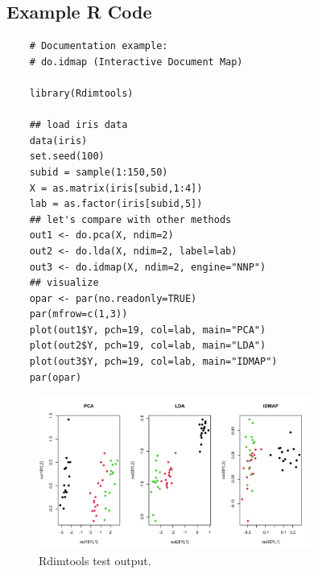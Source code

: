 \documentclass[a4paper,12pt]{article}
\begin{document}
\subsection{Example R Code}

\begin{verbatim}
    # Documentation example:
    # do.idmap (Interactive Document Map)

    library(Rdimtools)

    ## load iris data
    data(iris)
    set.seed(100)
    subid = sample(1:150,50)
    X = as.matrix(iris[subid,1:4])
    lab = as.factor(iris[subid,5])
    ## let's compare with other methods
    out1 <- do.pca(X, ndim=2)
    out2 <- do.lda(X, ndim=2, label=lab)
    out3 <- do.idmap(X, ndim=2, engine="NNP")
    ## visualize
    opar <- par(no.readonly=TRUE)
    par(mfrow=c(1,3))
    plot(out1$Y, pch=19, col=lab, main="PCA")
    plot(out2$Y, pch=19, col=lab, main="LDA")
    plot(out3$Y, pch=19, col=lab, main="IDMAP")
    par(opar)
\end{verbatim}

\begin{figure}[h]
    \centering
    \includegraphics[width=0.8\textwidth]{../../code/Rdimtools_test.png}
    \caption{Rdimtools test output.}
    \label{fig:rdimtools_test}
\end{figure}


\pagebreak
\printbibliography
\end{document}
